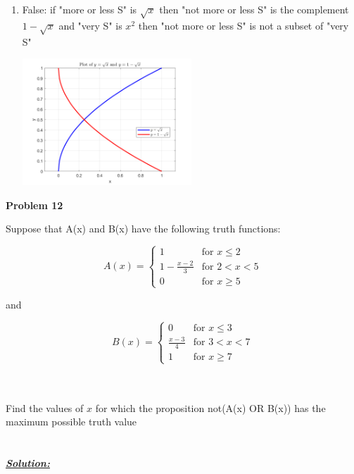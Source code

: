 \documentclass{article}
\begin{document}
\begin{enumerate}
  \item False: if "more or less S" is  ${\sqrt{x}}$ then "not more or less S" is the complement ${1-\sqrt{x}}$ and "very S" is ${x^2}$ then "not more or less S" is not a subset of "very S"
  \\ \begin{center} \includegraphics[width=0.5\textwidth]{Problem11_4.png} \end{center}
\end{enumerate}


\newpage
\noindent \textbf{Problem 12}

\noindent Suppose that A(x) and B(x) have the following truth functions: \\
\noindent \newline
\begin{minipage}{0.45\textwidth}
  \[ A(x) = \begin{cases}
      1 & \text{for } x \leq 2 \\
      1 - \frac{x-2}{3} & \text{for } 2 < x < 5 \\
      0 & \text{for } x \geq 5
  \end{cases} \]
\end{minipage}
\hfill and
\begin{minipage}{0.45\textwidth}
  \[ B(x) = \begin{cases}
      0 & \text{for } x \leq 3 \\
      \frac{x-3}{4} & \text{for } 3 < x < 7 \\
      1 & \text{for } x \geq 7
  \end{cases} \]
\end{minipage}

\noindent \newline \\ \\ Find the values of $x$ for which the proposition not(A(x) OR B(x)) has the maximum possible truth value\\ \\ \\
\underline{\textbf{\textit{Solution:}}}
\end{document}
